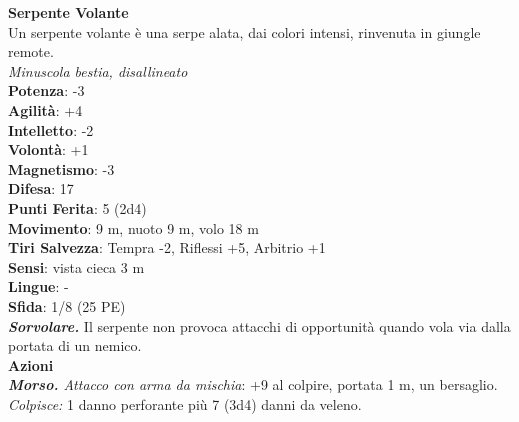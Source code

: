 \begin{multicols}{2}
\medskip\textbf{Serpente Volante}\\
Un serpente volante è una serpe alata, dai colori intensi, rinvenuta in giungle remote.\\
\emph{Minuscola bestia, disallineato}\\
\textbf{Potenza}: -3\\
\textbf{Agilità}: +4\\
\textbf{Intelletto}: -2\\
\textbf{Volontà}: +1\\
\textbf{Magnetismo}: -3\\
\textbf{Difesa}: 17\\
\textbf{Punti Ferita}: 5 (2d4)\\
\textbf{Movimento}: 9 m, nuoto 9 m, volo 18 m\\
\textbf{Tiri Salvezza}: Tempra -2, Riflessi +5, Arbitrio +1\\
\textbf{Sensi}: vista cieca 3 m\\
\textbf{Lingue}: -\\
\textbf{Sfida}: 1/8 (25 PE)\smallskip\\
\emph{\textbf{Sorvolare.}} Il serpente non provoca attacchi di opportunità quando vola via dalla portata di un nemico.\\
\smallskip\textbf{Azioni}\\
\emph{\textbf{Morso.} Attacco con arma da mischia}: +9 al colpire, portata 1 m, un bersaglio.\\
\emph{Colpisce:} 1 danno perforante più 7 (3d4) danni da veleno.\\


\end{multicols}
